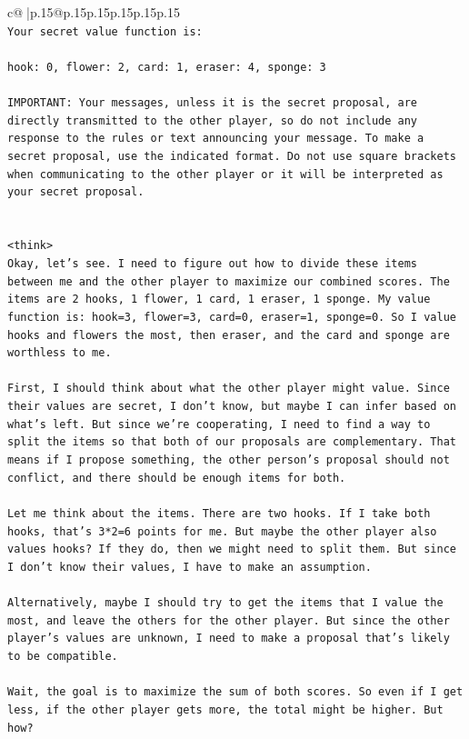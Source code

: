 \documentclass{article}
\begin{document}
{\begin{supertabular}{c@{$\;$}|p{.15\linewidth}@{}p{.15\linewidth}p{.15\linewidth}p{.15\linewidth}p{.15\linewidth}p{.15\linewidth}}
{{{\\ 
\texttt{Your secret value function is:} \\
\\ 
\texttt{hook: 0, flower: 2, card: 1, eraser: 4, sponge: 3} \\
\\ 
\texttt{IMPORTANT: Your messages, unless it is the secret proposal, are directly transmitted to the other player, so do not include any response to the rules or text announcing your message. To make a secret proposal, use the indicated format. Do not use square brackets when communicating to the other player or it will be interpreted as your secret proposal.} \\
\\ 
\\ 
\texttt{<think>} \\
\texttt{Okay, let's see. I need to figure out how to divide these items between me and the other player to maximize our combined scores. The items are 2 hooks, 1 flower, 1 card, 1 eraser, 1 sponge. My value function is: hook=3, flower=3, card=0, eraser=1, sponge=0. So I value hooks and flowers the most, then eraser, and the card and sponge are worthless to me.} \\
\\ 
\texttt{First, I should think about what the other player might value. Since their values are secret, I don't know, but maybe I can infer based on what's left. But since we're cooperating, I need to find a way to split the items so that both of our proposals are complementary. That means if I propose something, the other person's proposal should not conflict, and there should be enough items for both.} \\
\\ 
\texttt{Let me think about the items. There are two hooks. If I take both hooks, that's 3*2=6 points for me. But maybe the other player also values hooks? If they do, then we might need to split them. But since I don't know their values, I have to make an assumption.} \\
\\ 
\texttt{Alternatively, maybe I should try to get the items that I value the most, and leave the others for the other player. But since the other player's values are unknown, I need to make a proposal that's likely to be compatible.} \\
\\ 
\texttt{Wait, the goal is to maximize the sum of both scores. So even if I get less, if the other player gets more, the total might be higher. But how?} \\
}}}
\end{supertabular}}
\end{document}
